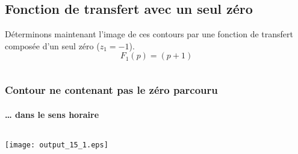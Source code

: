 \subsection{Fonction de transfert avec un seul zéro
\label{fonction-de-transfert-avec-un-seul-zuxe9ro}}
Déterminons maintenant l'image de ces contours par une fonction de
transfert composée d'un seul zéro (\(z_1=-1\)).
\[
F_1(p)=(p+1)
\]
\begin{tcolorbox}[breakable, size=fbox, boxrule=1pt, pad at break*=1mm,colback=cellbackground, colframe=cellborder]
\inputminted{python}{codes/python/annexe_cauchy_cellule6.py}
\end{tcolorbox}
\subsubsection{Contour ne contenant pas le zéro parcouru\label{contour-nentourant-pas-le-zuxe9ro-parcouru}}
\paragraph{\ldots{} dans le sens horaire\label{dans-le-sens-horaire}}
\begin{tcolorbox}[breakable, size=fbox, boxrule=1pt, pad at break*=1mm,colback=cellbackground, colframe=cellborder]
\inputminted{python}{codes/python/annexe_cauchy_cellule7.py}
\end{tcolorbox}
\begin{center}
    \texttt{[image: output\_15\_1.eps]}
\end{center}

